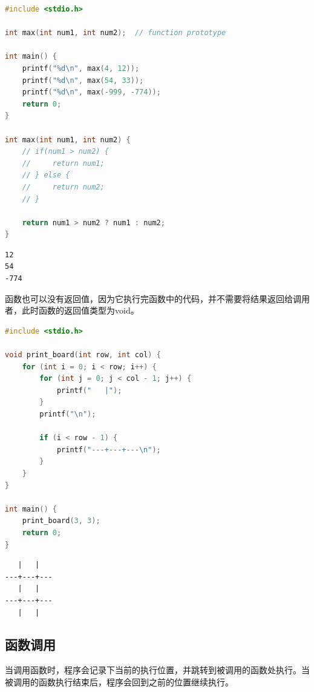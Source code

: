 \vspace{0.5cm}


\begin{lstlisting}[language=C]
#include <stdio.h>

int max(int num1, int num2);  // function prototype

int main() {
	printf("%d\n", max(4, 12));
	printf("%d\n", max(54, 33));
	printf("%d\n", max(-999, -774));
	return 0;
}

int max(int num1, int num2) {
	// if(num1 > num2) {
	//     return num1;
	// } else {
	//     return num2;
	// }

	return num1 > num2 ? num1 : num2;
}
\end{lstlisting}

\begin{tcolorbox}
	\begin{verbatim}
12
54
-774
	\end{verbatim}
\end{tcolorbox}

函数也可以没有返回值，因为它执行完函数中的代码，并不需要将结果返回给调用者，此时函数的返回值类型为void。\\


\begin{lstlisting}[language=C]
#include <stdio.h>

void print_board(int row, int col) {
	for (int i = 0; i < row; i++) {
		for (int j = 0; j < col - 1; j++) {
			printf("   |");
		}
		printf("\n");

		if (i < row - 1) {
			printf("---+---+---\n");
		}
	}
}

int main() {
	print_board(3, 3);
	return 0;
}
\end{lstlisting}

\begin{tcolorbox}
	\begin{verbatim}
   |   |
---+---+---
   |   |
---+---+---
   |   |
	\end{verbatim}
\end{tcolorbox}

\vspace{0.5cm}

\subsection{函数调用}

当调用函数时，程序会记录下当前的执行位置，并跳转到被调用的函数处执行。当被调用的函数执行结束后，程序会回到之前的位置继续执行。\\

